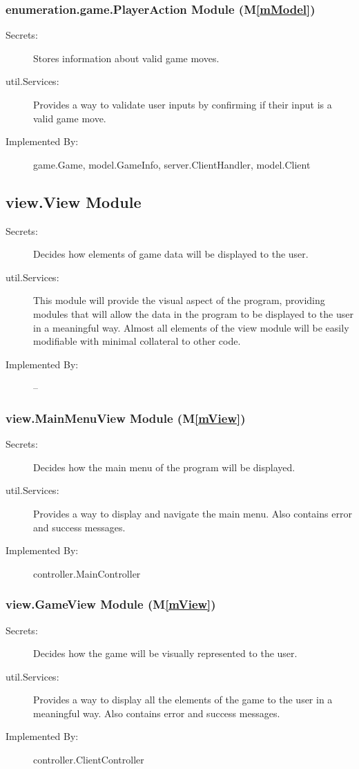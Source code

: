 \documentclass[12pt, titlepage]{article}
\newcommand{\mref}[1]{M\ref{#1}}
\begin{document}
\subsubsection{ enumeration.game.PlayerAction Module (\mref{mModel})}
    \begin{description}
    \item[Secrets:] Stores information about valid game moves.
    \item[util.Services:] Provides a way to validate user inputs by confirming if their input is a valid game move.
    \item[Implemented By:] game.Game, model.GameInfo, server.ClientHandler, model.Client
    \end{description}

\subsection{view.View Module}
    \begin{description}
    \item[Secrets:] Decides how elements of game data will be displayed to the user.
    \item[util.Services:] This module will provide the visual aspect of the program, providing modules that will allow the data in the program to be displayed to the user in a meaningful way. Almost all elements of the view module will be easily modifiable with minimal collateral to other code.
    \item[Implemented By:] --
    \end{description}

\subsubsection{ view.MainMenuView Module (\mref{mView})}
    \begin{description}
    \item[Secrets:] Decides how the main menu of the program will be displayed.
    \item[util.Services:] Provides a way to display and navigate the main menu. Also contains error and success messages.
    \item[Implemented By:] controller.MainController
    \end{description}
    
\subsubsection{ view.GameView Module (\mref{mView})}
    \begin{description}
    \item[Secrets:] Decides how the game will be visually represented to the user.
    \item[util.Services:] Provides a way to display all the elements of the game to the user in a meaningful way. Also contains error and success messages.
    \item[Implemented By:] controller.ClientController
    \end{description}
\end{document}
